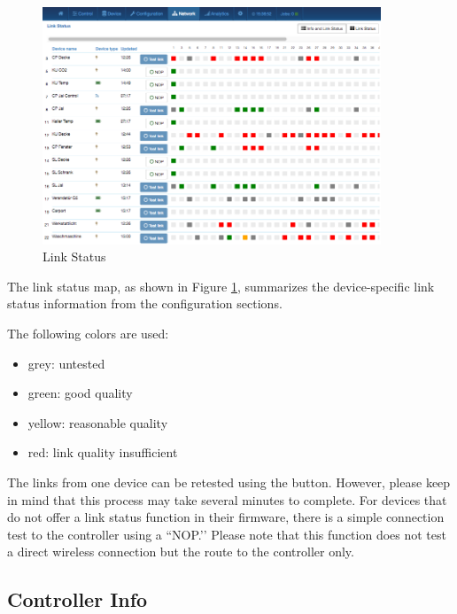 \begin{figure}
\begin{center}
\includegraphics[width=0.9\textwidth]{pngs/cap7/eui26.png}
\caption{Link Status}
\label{eui26}
\end{center}
\end{figure}

The link status map, as shown in Figure \ref{eui26}, summarizes the device-specific link 
status information from the configuration sections.

The following colors are used:

\begin{itemize}
\item grey: untested
\item green: good quality
\item yellow: reasonable quality
\item red: link quality insufficient
\end{itemize}

The links from one device can be retested using the  button. However, please 
keep in mind that this process may take several minutes to complete.
For devices that do not offer a link status function in their firmware, there is a simple 
connection test to the \zway controller using a ``NOP.’’ Please note that this function 
does not test a direct wireless connection but the route to the controller only.

\subsection{Controller Info}

